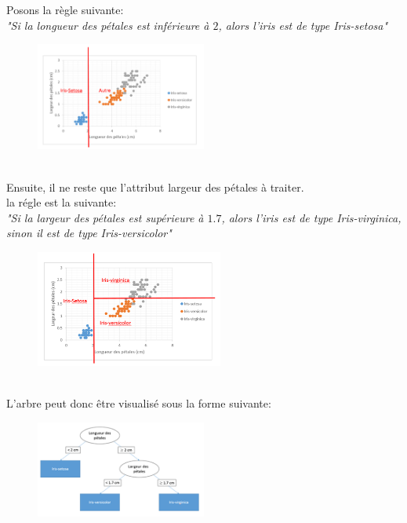\documentclass[11pt,twoside,openany,x11names,svgnames]{memoir}
\begin{document}
\begin{itemize}
		Posons la règle suivante:\\
		\textsl{"Si la longueur des pétales est inférieure à $2$, alors l'iris est de type Iris-setosa"} \\
				
				\begin{figure}[h]
			\centering
				\includegraphics[width=0.5\textwidth]{img5_iris.png}
			\label{}
		\end{figure} \\
				Ensuite, il ne reste que l'attribut largeur des pétales à traiter. \\
				la régle est la suivante: \\
				\textsl{"Si la largeur des pétales est supérieure à $1.7$, alors l'iris est de type Iris-virginica, sinon il est de type Iris-versicolor"} \\
				
				\begin{figure}[h]
			\centering
				\includegraphics[width=0.55\textwidth]{img6_iris.png}
			\label{}
		\end{figure} \\
		\newpage
		L'arbre peut donc être visualisé sous la forme suivante: \\
		\begin{figure}[h]
			\centering
				\includegraphics[width=0.5\textwidth]{img7_iris.png}
			\label{}
		\end{figure} \\
		

\end{itemize}
\end{document}
